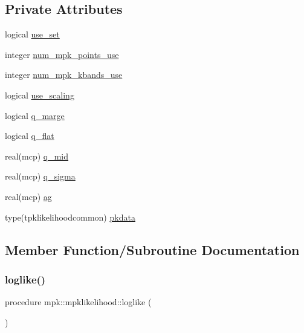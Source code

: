 \subsection*{Private Attributes}
\begin{DoxyCompactItemize}
\item 
logical \mbox{\hyperlink{structmpk_1_1mpklikelihood_a1a00b24cd89a812bb77b1e54d69ddfb4}{use\+\_\+set}}
\item 
integer \mbox{\hyperlink{structmpk_1_1mpklikelihood_a1dc7200d8acc503cb77d5bf80a4b15e4}{num\+\_\+mpk\+\_\+points\+\_\+use}}
\item 
integer \mbox{\hyperlink{structmpk_1_1mpklikelihood_a66aa02f658d59cb6494f6ea0b4c7b9c5}{num\+\_\+mpk\+\_\+kbands\+\_\+use}}
\item 
logical \mbox{\hyperlink{structmpk_1_1mpklikelihood_a376b25f8e28ee6772e07f067a49894c1}{use\+\_\+scaling}}
\item 
logical \mbox{\hyperlink{structmpk_1_1mpklikelihood_a00e1f6d7b7adc877ae61065fd9ae8815}{q\+\_\+marge}}
\item 
logical \mbox{\hyperlink{structmpk_1_1mpklikelihood_aac46dabd591cdedfe0d8b404c00736f8}{q\+\_\+flat}}
\item 
real(mcp) \mbox{\hyperlink{structmpk_1_1mpklikelihood_a872ba2767b691dc71dd4e5a2d281a76d}{q\+\_\+mid}}
\item 
real(mcp) \mbox{\hyperlink{structmpk_1_1mpklikelihood_a0e22d77866f6149f5b1179d7e2630ee7}{q\+\_\+sigma}}
\item 
real(mcp) \mbox{\hyperlink{structmpk_1_1mpklikelihood_a2addad34996648417aae9923dc67a2dd}{ag}}
\item 
type(tpklikelihoodcommon) \mbox{\hyperlink{structmpk_1_1mpklikelihood_a7225968d3772142eebd2735973470748}{pkdata}}
\end{DoxyCompactItemize}


\subsection{Member Function/\+Subroutine Documentation}
\mbox{\label{structmpk_1_1mpklikelihood_a0ab95ecb535693d628ac8165ad3bf841}} 
\subsubsection{\texorpdfstring{loglike()}{loglike()}}
{\footnotesize\ttfamily procedure mpk\+::mpklikelihood\+::loglike (\begin{DoxyParamCaption}{ }\end{DoxyParamCaption})\hspace{0.3cm}{\ttfamily [private]}}

